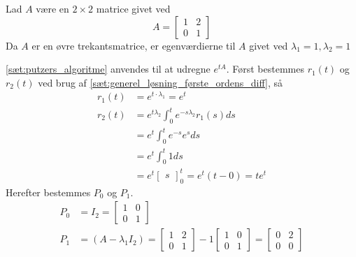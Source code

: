 \begin{eks} \textbf{} %
\newline
    Lad $A$ være en $2\times 2$ matrice givet ved
    $$A =   \begin{bmatrix}
                1 & 2\\
                0 & 1
            \end{bmatrix} $$
    Da $A$ er en øvre trekantsmatrice, er egenværdierne til $A$ givet ved $\lambda_1 = 1, \lambda_2 = 1$
    
    \autoref{sæt:putzers_algoritme} anvendes til at udregne $e^{tA}$. Først bestemmes $r_1(t)$ og $r_2(t)$ ved brug af \autoref{sæt:generel_løsning_første_ordens_diff}, så
    \begin{align*}
        r_1(t) &= e^{t\cdot \lambda_1} = e^t\\
        r_2(t) &= e^{t\lambda_2} \int_0^t e^{-s\lambda_2} r_1(s) ds\\
               &= e^t \int_0^t e^{-s} e^s ds\\
               &= e^t \int_0^t 1 ds\\
               &= e^t \begin{bmatrix}s \end{bmatrix}_0^t = e^t (t-0) = t e^t
    \end{align*}
    Herefter bestemmes $P_0$ og $P_1$.
    \begin{align*}
        P_0 &= I_2 = \begin{bmatrix}
                        1 & 0\\
                        0 & 1
                    \end{bmatrix}\\
        P_1 &= (A - \lambda_1 I_2) 
        = \begin{bmatrix}
            1 & 2\\
            0 & 1
          \end{bmatrix}
        -1 \begin{bmatrix}
            1 & 0\\
            0 & 1
          \end{bmatrix}
        = \begin{bmatrix}
            0 & 2\\
            0 & 0
          \end{bmatrix}
    \end{align*}


\end{eks}

